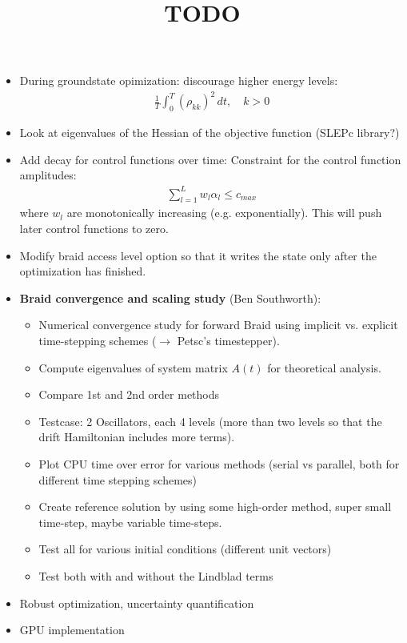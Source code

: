 \documentclass{article}
\title{TODO}
\begin{document}
\maketitle

\begin{itemize}
  \item During groundstate opimization: discourage higher energy levels:
     \begin{align*}
        \frac 1 T \int_0^T \left( \rho_{kk}\right)^2 \, dt, \quad k > 0
     \end{align*}
  \item Look at eigenvalues of the Hessian of the objective function (SLEPc library?)
  \item Add decay for control functions over time: Constraint for the control function amplitudes:
      \begin{align*}
          \sum_{l=1}^L w_l\alpha_l \leq c_{max}
      \end{align*}
        where $w_l$ are monotonically increasing (e.g. exponentially). This will push later control functions to zero. 
  \item Modify braid access level option so that it writes the state only after the optimization has finished. 
  \item \textbf{Braid convergence and scaling study} (Ben Southworth):
        \begin{itemize}
          \item Numerical convergence study for forward Braid using implicit vs. explicit time-stepping schemes ($\rightarrow$ Petsc's timestepper).
          \item Compute eigenvalues of system matrix $A(t)$ for theoretical analysis. 
          \item Compare 1st and 2nd order methods
          \item Testcase: 2 Oscillators, each 4 levels (more than two levels so that the drift Hamiltonian includes more terms). 
          \item Plot CPU time over error for various methods (serial vs parallel, both for different time stepping schemes)
          \item Create reference solution by using some high-order method, super small time-step, maybe variable time-steps. 
          \item Test all for various initial conditions (different unit vectors)
          \item Test both with and without the Lindblad terms
        \end{itemize}  
  \item Robust optimization, uncertainty quantification
  \item GPU implementation
\end{itemize}
\end{document}
